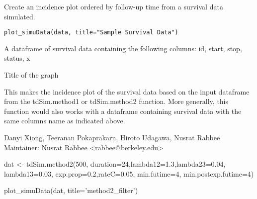 \documentclass[a4paper]{book}
\begin{document}
%
\begin{Description}\relax

Create an incidence plot ordered by follow-up time from a survival data simulated.
\end{Description}
%
\begin{Usage}
\begin{verbatim}
plot_simuData(data, title="Sample Survival Data")
\end{verbatim}
\end{Usage}
%
\begin{Arguments}
\begin{ldescription}
\item[\code{data}] 
A dataframe of survival data containing the following columns: id, start, stop, status, x

\item[\code{title}] 
Title of the graph

\end{ldescription}
\end{Arguments}
%
\begin{Details}\relax

This makes the incidence plot of the survival data based on the input dataframe from the tdSim.method1 or tdSim.method2 function. More generally, this function would also works with a dataframe containing survival data with the same columns name as indicated above.
\end{Details}
%
\begin{Author}\relax
Danyi Xiong, Teeranan Pokaprakarn, Hiroto Udagawa, Nusrat Rabbee \\{}
Maintainer: Nusrat Rabbee <rabbee@berkeley.edu>
\end{Author}
%
\begin{Examples}
\begin{ExampleCode}
dat <- tdSim.method2(500, duration=24,lambda12=1.3,lambda23=0.04, 
    lambda13=0.03, exp.prop=0.2,rateC=0.05, min.futime=4, min.postexp.futime=4)
	
plot_simuData(dat, title='method2_filter')
\end{ExampleCode}
\end{Examples}
\end{document}
